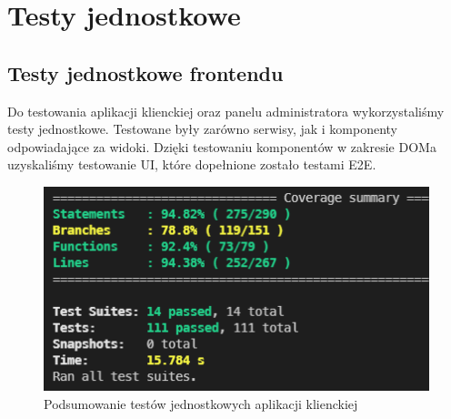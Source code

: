 \documentclass[12pt]{article}
\begin{document}

\tableofcontents

\newpage

\section{Testy jednostkowe}

\subsection{Testy jednostkowe frontendu}

Do testowania aplikacji klienckiej oraz panelu administratora wykorzystaliśmy testy jednostkowe. Testowane były zarówno serwisy, jak i komponenty odpowiadające za widoki. Dzięki testowaniu komponentów w zakresie DOMa uzyskaliśmy testowanie UI, które dopełnione zostało testami E2E.

\begin{figure}[!h]
	\centering
	\includegraphics[width=0.7\linewidth]{res/client-test}
	\caption{Podsumowanie testów jednostkowych aplikacji klienckiej}
	\label{fig:client-test}
\end{figure}
\end{document}
